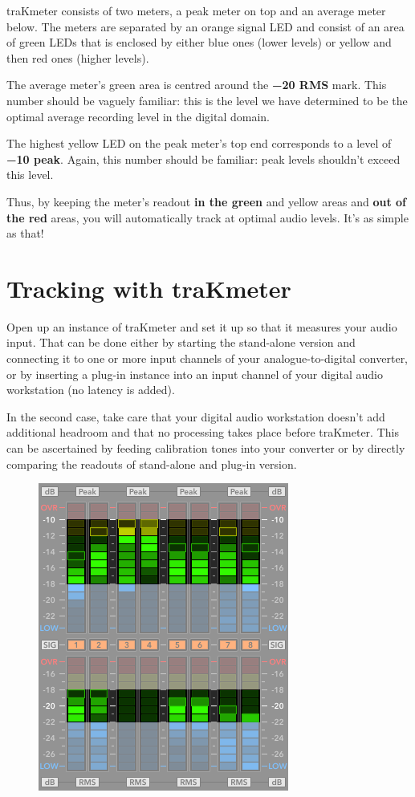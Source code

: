 traKmeter consists of two meters, a peak meter on top and an average
meter below.  The meters are separated by an orange signal LED and
consist of an area of green LEDs that is enclosed by either blue ones
(lower levels) or yellow and then red ones (higher levels).

The average meter's green area is centred around the
\textbf{\SI{-20}{\dBFS} RMS} mark.  This number should be vaguely
familiar: this is the level we have determined to be the optimal
average recording level in the digital domain.

The highest yellow LED on the peak meter's top end corresponds to a
level of \textbf{\SI{-10}{\dBFS} peak}.  Again, this number should be
familiar: peak levels shouldn't exceed this level.

Thus, by keeping the meter's readout \textbf{in the green} and yellow
areas and \textbf{out of the red} areas, you will automatically track
at optimal audio levels.  It's as simple as that!

\section{Tracking with traKmeter}
\label{sec:tracking_with_trakmeter}

Open up an instance of traKmeter and set it up so that it measures
your audio input.  That can be done either by starting the stand-alone
version and connecting it to one or more input channels of your
analogue-to-digital converter, or by inserting a plug-in instance into
an input channel of your digital audio workstation (no latency is
added).

In the second case, take care that your digital audio workstation
doesn't add additional headroom and that no processing takes place
before traKmeter.  This can be ascertained by feeding calibration
tones into your converter or by directly comparing the readouts of
stand-alone and plug-in version.

\begin{figure}
  \includegraphics[scale=0.425,clip]{include/images/trakmeter_optimal.png}
\end{figure}

